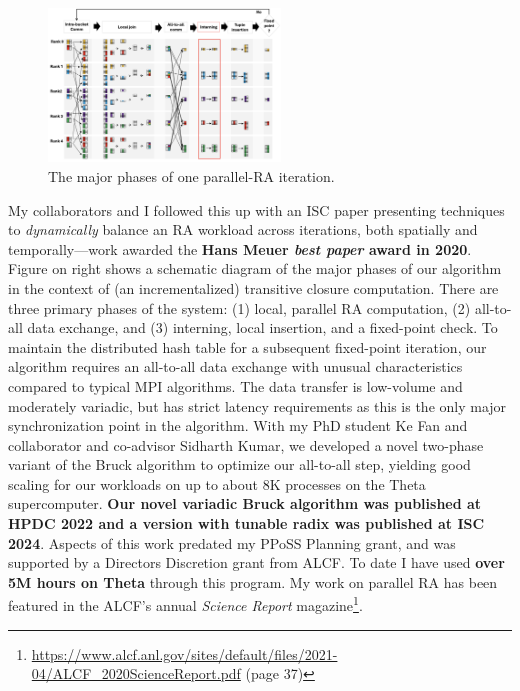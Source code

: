 \documentclass[12pt]{article}
\begin{document}
\begin{figure}
  \vspace{-0.60cm}
  \includegraphics[width=0.55\textwidth]{JoinIteration.png}
  \vspace{-0.75cm}
  \caption{\footnotesize The major phases of one parallel-RA iteration.}
  \label{fig:bpra}
  \vspace{-0.5cm}
\end{figure}
%
My collaborators and I followed this up with an ISC paper presenting techniques to \emph{dynamically} balance an RA workload across iterations, both spatially and temporally---work awarded the \textbf{Hans Meuer \emph{best paper} award in 2020}. 
%
Figure on right shows a schematic diagram of the major phases
of our algorithm in the context of (an incrementalized) transitive closure computation. There are three primary phases of the system: (1) local, parallel RA computation, (2) all-to-all data exchange, and (3) interning, local insertion, and a fixed-point check. To maintain the distributed hash table for a subsequent fixed-point iteration, our algorithm requires an all-to-all data exchange with unusual characteristics compared to typical MPI algorithms. The data transfer is low-volume and moderately variadic, but has strict latency requirements as this is the only major synchronization point in the algorithm. With my PhD student Ke Fan and collaborator and co-advisor Sidharth Kumar, we developed a novel two-phase variant of the Bruck algorithm to optimize our all-to-all step, yielding good scaling for our workloads on up to about 8K processes on the Theta supercomputer. \textbf{Our novel variadic Bruck algorithm was published at HPDC 2022 and a version with tunable radix was published at ISC 2024}.  
Aspects of this work predated my PPoSS Planning grant, and was supported by a Directors Discretion grant from ALCF. To date I have used \textbf{over 5M hours on Theta} through this program. My work on parallel RA has been featured in the ALCF's annual \emph{Science Report} magazine\footnote{\url{https://www.alcf.anl.gov/sites/default/files/2021-04/ALCF_2020ScienceReport.pdf} (page 37)}.
\end{document}
